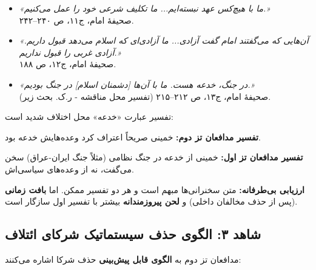 \documentclass[12pt,a4paper]{book}
\newcommand{\keyword}[1]{\textbf{\textcolor{cPrimary}{#1}}}
\begin{document}
\begin{noteBox}
\begin{itemize}[label=\textcolor{cGold}{$\blacktriangleright$}, rightmargin=2em]
    \item \textit{«ما با هیچ‌کس عهد نبسته‌ایم... ما تکلیف شرعی خود را عمل می‌کنیم.»}\\
    {\footnotesize صحیفهٔ امام، ج۱۱، ص ۲۴۰–۲۴۲.}

    \item \textit{«آن‌هایی که می‌گفتند امام گفت آزادی... ما آزادی‌ای که اسلام می‌دهد قبول داریم. آزادی غربی را قبول نداریم.»}\\
    {\footnotesize صحیفهٔ امام، ج۱۲، ص ۱۸۸.}

    \item \textit{«در جنگ، خدعه هست. ما با آن‌ها [دشمنان اسلام] در جنگ بودیم.»}\\
    {\footnotesize صحیفهٔ امام، ج۱۳، ص ۲۱۲–۲۱۵ (تفسیر محل مناقشه - ر.ک. بحث زیر).}
\end{itemize}
\end{noteBox}

\begin{warningBox}
تفسیر عبارت «خدعه» محل اختلاف شدید است:

\textbf{تفسیر مدافعان تز دوم:} خمینی صریحاً اعتراف کرد وعده‌هایش خدعه بود.

\textbf{تفسیر مدافعان تز اول:} خمینی از خدعه در جنگ نظامی (مثلاً جنگ ایران-عراق) سخن می‌گفت، نه از وعده‌های سیاسی‌اش.

\textbf{ارزیابی بی‌طرفانه:} متن سخنرانی‌ها مبهم است و هر دو تفسیر ممکن. اما \keyword{بافت زمانی} (پس از حذف مخالفان داخلی) و \keyword{لحن پیروزمندانه} بیشتر با تفسیر اول سازگار است.
\end{warningBox}

\subsection{شاهد ۳: الگوی حذف سیستماتیک شرکای ائتلاف}

مدافعان تز دوم به \keyword{الگوی قابل پیش‌بینی} حذف شرکا اشاره می‌کنند:
\end{document}
